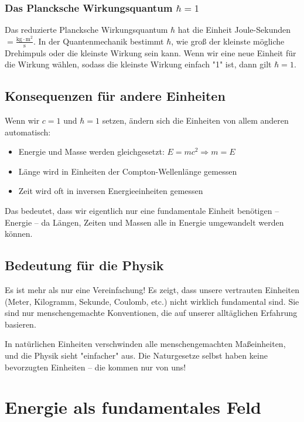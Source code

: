 \documentclass{article}
\begin{document}
	\subsubsection{Das Plancksche Wirkungsquantum $\hbar = 1$}
	Das reduzierte Plancksche Wirkungsquantum $\hbar$ hat die Einheit Joule-Sekunden $= \frac{\text{kg} \cdot \text{m}^2}{\text{s}}$. In der Quantenmechanik bestimmt $\hbar$, wie groß der kleinste mögliche Drehimpuls oder die kleinste Wirkung sein kann. Wenn wir eine neue Einheit für die Wirkung wählen, sodass die kleinste Wirkung einfach "1" ist, dann gilt $\hbar = 1$.
	
	\subsection{Konsequenzen für andere Einheiten}
	Wenn wir $c = 1$ und $\hbar = 1$ setzen, ändern sich die Einheiten von allem anderen automatisch:
	
	\begin{itemize}
		\item Energie und Masse werden gleichgesetzt: $E = mc^2 \Rightarrow m = E$
		\item Länge wird in Einheiten der Compton-Wellenlänge gemessen
		\item Zeit wird oft in inversen Energieeinheiten gemessen
	\end{itemize}
	
	Das bedeutet, dass wir eigentlich nur eine fundamentale Einheit benötigen – Energie – da Längen, Zeiten und Massen alle in Energie umgewandelt werden können.
	
	\subsection{Bedeutung für die Physik}
	Es ist mehr als nur eine Vereinfachung! Es zeigt, dass unsere vertrauten Einheiten (Meter, Kilogramm, Sekunde, Coulomb, etc.) nicht wirklich fundamental sind. Sie sind nur menschengemachte Konventionen, die auf unserer alltäglichen Erfahrung basieren.
	
	In natürlichen Einheiten verschwinden alle menschengemachten Maßeinheiten, und die Physik sieht "einfacher" aus. Die Naturgesetze selbst haben keine bevorzugten Einheiten – die kommen nur von uns!
	
	\section{Energie als fundamentales Feld}
	
\end{document}
